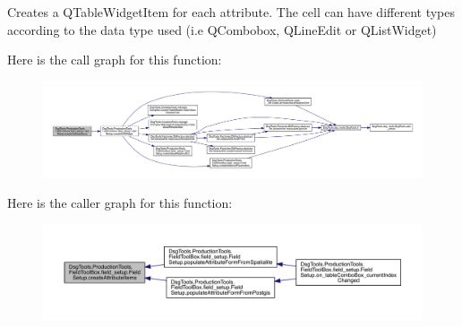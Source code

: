 \begin{DoxyVerb}Creates a QTableWidgetItem for each attribute.
The cell can have different types according to the data type used (i.e QCombobox, QLineEdit or QListWidget)
\end{DoxyVerb}
 Here is the call graph for this function\+:
\nopagebreak
\begin{figure}[H]
\begin{center}
\leavevmode
\includegraphics[width=350pt]{class_dsg_tools_1_1_production_tools_1_1_field_tool_box_1_1field__setup_1_1_field_setup_a85658685ed7ca0f73f76781de8fde63b_cgraph}
\end{center}
\end{figure}
Here is the caller graph for this function\+:
\nopagebreak
\begin{figure}[H]
\begin{center}
\leavevmode
\includegraphics[width=350pt]{class_dsg_tools_1_1_production_tools_1_1_field_tool_box_1_1field__setup_1_1_field_setup_a85658685ed7ca0f73f76781de8fde63b_icgraph}
\end{center}
\end{figure}
\mbox{\label{class_dsg_tools_1_1_production_tools_1_1_field_tool_box_1_1field__setup_1_1_field_setup_aa84f33d5c8b64e1d511cfbda1731e99e}} 
